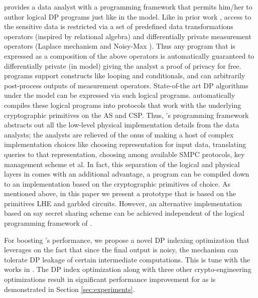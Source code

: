 \system provides a data analyst with a programming framework  that permits him/her to author logical DP programs just like in the \cdp model.  Like in prior work \cite{PINQ, FWPINQ, ektelo}, access to the sensitive data is restricted via a set of predefined data transformations operators (inspired by relational algebra) and differentially private measurement operators (Laplace mechanism and Noisy-Max \cite{Dork}). Thus any program that is expressed as a composition of the above operators is automatically guaranteed to differentially private (in \cdp model) giving the analyst a proof of privacy for free. \system programs support constructs like looping and conditionals, and can arbitrarily post-process outputs of measurement operators. State-of-the art DP algorithms under the \cdp model can be  expressed via such logical programs. \system automatically compiles these logical programs into \system protocols that work with the underlying cryptographic primitives on the \textsf{AS} and \textsf{CSP}. Thus, \system's programming framework abstracts out all the low-level physical implementation details from the data analysts; the analysts are relieved of the onus of making a host of complex implementation choices like choosing representation for input data, translating queries to that representation, choosing among available SMPC protocols, key management scheme et al. In fact, this separation of the logical and physical layers in \system comes with an additional advantage, a \system program can be compiled down to an implementation based on the cryptographic primitives of choice. As mentioned above, in this paper we present a prototype \system that is based on the primitives LHE and garbled circuits. However, an alternative implementation based on say secret sharing scheme can be achieved independent of the logical programming framework of \system.
 
For boosting \system's performance, we propose a novel DP indexing optimization that leverages on the fact that since the final output is noisy, the mechanism can tolerate DP leakage of certain intermediate computations. This is tune with the works in \cite{Mazloom:2018:SCD,He:2017:RecordLinkage,Chan:2019:FDO:3310435.3310585,Groce}. The DP index optimization along with three other crypto-engineering optimizations result in significant performance improvement for \system as is demonstrated in Section \ref{sec:experiments}.  

